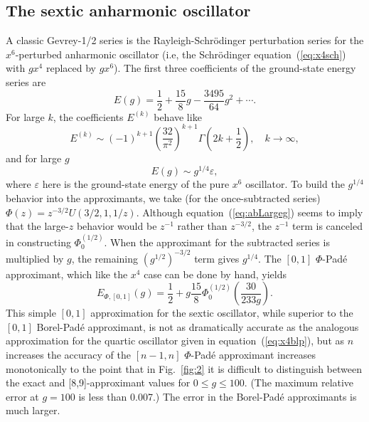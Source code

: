 \documentclass[12pt]{iopart}
\begin{document}
\subsection{The sextic anharmonic oscillator}
A classic Gevrey-1/2 series is the Rayleigh-Schr\"odinger perturbation series for the $x^6$-perturbed
anharmonic oscillator (i.e, the Schr\"odinger equation~(\ref{eq:x4sch}) with $g x^4$ replaced by $g x^6$). 
The first three coefficients of the ground-state energy series are
%
 \begin{equation}
 	E(g) = \frac{1}{2}+\frac{15}{8} g -\frac{3495}{64}  g^2 + \cdots.
\end{equation}
%
For large $k$, the coefficients $E^{(k)}$ behave like
\begin{equation}
	E^{(k)} \sim 
	(-1)^{k+1} \left(\frac{32}{\pi^2}\right)^{k+1} \Gamma\left(2k+\frac{1}{2}\right),
	\quad k\to\infty ,
\end{equation}
%
and for large $g$
%
\begin{equation}
  E(g) \sim g^{1/4} \varepsilon,
\end{equation}
%
where $\varepsilon$ here is the ground-state energy of the pure $x^6$ oscillator. To build the $g^{1/4}$ behavior into the approximants, we take (for the once-subtracted series) $\Phi(z)=z^{-3/2}U(3/2,1,1/z)$. Although equation~(\ref{eq:abLargeg}) seems to imply that the large-$z$ behavior would be $z^{-1}$ rather than $z^{-3/2}$, the $z^{-1}$ term is canceled in constructing $\Phi_0^{(1/2)}$. When the approximant for the subtracted series is multiplied by $g$, the remaining $(g^{1/2})^{-3/2}$ term gives $g^{1/4}$.
The $[0,1]$ $\Phi$-Pad\'e approximant, which like the $x^4$ case can be done by hand, yields
%
\begin{equation}
	\label{eq:x601}
	   E_{\Phi,[0,1]}(g) = \frac{1}{2} +  g \frac{15}{8} \Phi_0^{(1/2)}\left(\frac{30}{233 g}\right).
\end{equation}
%
This simple $[0,1]$ approximation for the sextic oscillator, while superior to the $[0,1]$ Borel-Pad\'e approximant, is not as dramatically accurate as the analogous
approximation for the quartic oscillator given in equation~(\ref{eq:x4blp}), but as $n$ increases
the accuracy of the $[n-1,n]$ $\Phi$-Pad\'e approximant increases monotonically to the point that in Fig.~\ref{fig:2} it is difficult to distinguish
between the exact and [8,9]-approximant values for $0\le g\le 100$. (The maximum relative error at $g=100$ is less than 0.007.) The error in the Borel-Pad\'e approximants is much larger.
\end{document}

